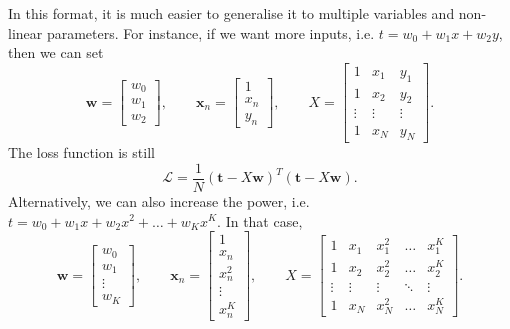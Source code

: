 \documentclass[a4paper, openany]{memoir}
\begin{document}
    In this format, it is much easier to generalise it to multiple variables and non-linear parameters. For instance, if we want more inputs, i.e. $t = w_0 + w_1x + w_2y$, then we can set
    \[\mathbf{w} = \begin{bmatrix}
        w_0 \\
        w_1 \\
        w_2
    \end{bmatrix}, \qquad \mathbf{x}_n = \begin{bmatrix}
        1 \\
        x_n \\
        y_n
    \end{bmatrix}, \qquad X = \begin{bmatrix}
        1 & x_1 & y_1 \\
        1 & x_2 & y_2 \\
        \vdots & \vdots & \vdots \\
        1 & x_N & y_N
    \end{bmatrix}.\]
    The loss function is still
    \[\mathcal{L} = \frac{1}{N} (\mathbf{t} - X \mathbf{w})^T (\mathbf{t} - X \mathbf{w}).\]
    Alternatively, we can also increase the power, i.e. $t = w_0 + w_1x + w_2x^2 + \dots + w_K x^K$. In that case,
    \[\mathbf{w} = \begin{bmatrix}
        w_0 \\
        w_1 \\
        \vdots \\
        w_K
    \end{bmatrix}, \qquad \mathbf{x}_n = \begin{bmatrix}
        1 \\
        x_n \\
        x_n^2 \\
        \vdots \\
        x_n^K
    \end{bmatrix}, \qquad X = \begin{bmatrix}
        1 & x_1 & x_1^2 & \dots & x_1^K \\
        1 & x_2 & x_2^2 & \dots & x_2^K \\
        \vdots & \vdots & \vdots & \ddots & \vdots \\
        1 & x_N & x_N^2 & \dots & x_N^K
    \end{bmatrix}.\]
\end{document}
